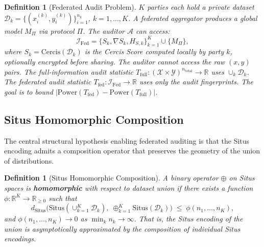\documentclass[12pt,a4paper]{article}
\newtheorem{definition}[theorem]{Definition}
\newcommand{\R}{\mathbb{R}}
\newcommand{\cX}{\mathcal{X}}
\newcommand{\cY}{\mathcal{Y}}
\newcommand{\cD}{\mathcal{D}}
\newcommand{\cA}{\mathcal{A}}
\newcommand{\cI}{\mathcal{I}}
\newcommand{\Situs}{\mathrm{Situs}}
\newcommand{\Cercis}{\mathrm{Cercis}}
\begin{document}
\begin{definition}[Federated Audit Problem]
\label{def:fed-problem}
$K$ parties each hold a private dataset $\cD_k = \{(x_i^{(k)}, y_i^{(k)})\}_{i=1}^{n_k}$,
$k = 1, \dots, K$.  A federated aggregator produces a global model $M_\Pi$
via protocol $\Pi$.  The auditor $\cA$ can access:
\begin{equation}\label{eq:fed-info}
    \cI_{\mathrm{Fed}} = \{S_k, \nabla S_k, H_{S,k}\}_{k=1}^K \cup \{M_\Pi\},
\end{equation}
where $S_k = \Cercis(\cD_k)$ is the Cercis Score computed locally by party
$k$, optionally encrypted before sharing.  The auditor \emph{cannot} access
the raw $(x, y)$ pairs.  The full-information audit statistic
$T_{\mathrm{full}}: (\cX \times \cY)^{n_{\mathrm{total}}} \to \R$ uses
$\cup_k \cD_k$.  The federated audit statistic
$T_{\mathrm{fed}}: \cI_{\mathrm{Fed}} \to \R$ uses only the audit
fingerprints.  The goal is to bound
$|\mathrm{Power}(T_{\mathrm{fed}}) - \mathrm{Power}(T_{\mathrm{full}})|$.
\end{definition}

\subsection{Situs Homomorphic Composition}

The central structural hypothesis enabling federated auditing is that the
Situs encoding admits a composition operator that preserves the geometry of
the union of distributions.

\begin{definition}[Situs Homomorphic Composition]
\label{def:situs-hom}
A binary operator $\oplus$ on Situs spaces is \textbf{homomorphic} with
respect to dataset union if there exists a function
$\phi: \R^K \to \R_{\geq 0}$ such that
\begin{equation}\label{eq:homomorphism}
    d_{\Situs}\!\big(\Situs(\cup_{k=1}^K \cD_k),\;
    \oplus_{k=1}^K \Situs(\cD_k)\big)
    \;\leq\; \phi(n_1, \dots, n_K),
\end{equation}
and $\phi(n_1, \dots, n_K) \to 0$ as $\min_k n_k \to \infty$.  That is, the
Situs encoding of the union is asymptotically approximated by the composition
of individual Situs encodings.
\end{definition}
\end{document}
